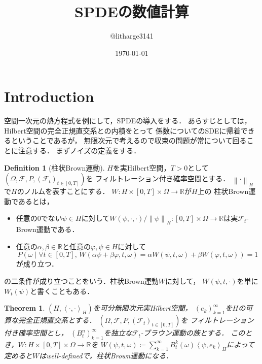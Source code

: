 \documentclass[dvipdfmx,autodetect-engine]{jsarticle}
\newtheorem{theorem}{Theorem}[section]
\theoremstyle{remark}
\theoremstyle{definition}
\newtheorem{definition}{Definition}[section]
\newcommand{\R}{\mathbb{R}}
\newcommand{\norm}[1]{\left\lVert#1\right\rVert}
\newcommand{\setmid}{\mathrel{} \middle| \mathrel{}}
\newcommand{\paren}[1]{\left( #1 \right)}
\newcommand{\iprod}[1]{\left\langle #1 \right\rangle}
\begin{document}
\title{SPDEの数値計算}
\author{@litharge3141}
\date{\today}
\maketitle

\section{Introduction}
空間一次元の熱方程式を例にして，SPDEの導入をする．
あらすじとしては，Hilbert空間の完全正規直交系との内積をとって
係数についてのSDEに帰着できるということであるが，
無限次元で考えるので収束の問題が常について回ることに注意する．
まずノイズの定義をする．


\begin{definition}[柱状Brown運動]
$H$を実Hilbert空間，$T>0$として
$(\Omega,\mathcal{F},P,(\mathcal{F}_{t})_{t\in [0,T]})$を
フィルトレーション付き確率空間とする．
$\norm{\cdot}_{H}$で$H$のノルムを表すことにする．
$W \colon H  \times [0,T] \times \Omega \to \R$が$H$上の
柱状Brown運動であるとは，
\begin{itemize}
    \item 任意の$0$でない$\psi \in H$に対して$W(\psi,\cdot,\cdot) / \norm{\psi}_{H}
    \colon [0,T]\times\Omega  \to \R$は実$\mathcal{F}_{t}$-Brown運動である．
    \item 任意の$\alpha,\beta \in \R$と任意の$\varphi,\psi \in H$に対して
    \begin{equation}
        P\paren{\omega \setmid \forall t \in [0,T],\,
        W(\alpha\psi + \beta\varphi,t,\omega) = 
    \alpha W(\psi,t,\omega) + \beta W(\varphi, t, \omega)} =1
    \end{equation}
    が成り立つ．
\end{itemize}
の二条件が成り立つことをいう．柱状Brown運動$W$に対して，
$W(\psi,t,\cdot)$を単に$W_{t}(\psi)$と書くこともある．
\end{definition}


\begin{theorem}
    $(H,\iprod{\cdot,\cdot}_{H})$を可分無限次元実Hilbert空間，
    $(e_{k})_{k=1}^{\infty}$を$H$の可算な完全正規直交系とする．
    $(\Omega,\mathcal{F},P,(\mathcal{F}_{t})_{t\in [0,T]})$を
    フィルトレーション付き確率空間とし，
    $(B_{t}^{n})_{k=1}^{\infty}$を独立な$\mathcal{F}_{t}$-ブラウン運動の族とする．
    このとき，$W \colon H \times [0,T]\times \Omega  \to \R$を
    $W(\psi,t,\omega) \coloneqq \sum_{k=1}^{\infty} B_{t}^{k}(\omega) \iprod{
    \psi, e_{k}}_{H}$によって定めると$W$はwell-definedで，柱状Brown運動になる．
\end{theorem}
\end{document}
